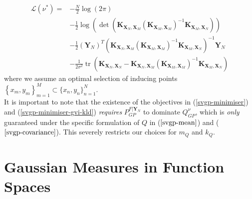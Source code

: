 \documentclass[twoside,11pt]{article}
\newcommand{\tr}{\operatorname{tr}}
\begin{document}
\begin{align}
    \label{svgp-optimal-elbo}
    \mathcal{L}(\nu^*) = &-\frac{N}{2} \log\left(2\pi \right)\\
    &-\frac{1}{2} \log \left(\det\left( \mathbf{K}_{\mathbf{X}_N, \mathbf{X}_M}\left(\mathbf{K}_{\mathbf{X}_M, \mathbf{X}_M}\right)^{-1} \mathbf{K}_{\mathbf{X}_M, \mathbf{X}_N}\right)\right)\\
    & -\frac{1}{2} \left(\mathbf{Y}_N\right)^T \left( \mathbf{K}_{\mathbf{X}_N, \mathbf{X}_M}\left(\mathbf{K}_{\mathbf{X}_M, \mathbf{X}_M}\right)^{-1} \mathbf{K}_{\mathbf{X}_M, \mathbf{X}_N}\right)^{-1} \mathbf{Y}_N \\
    &  - \frac{1}{2\sigma^2}\tr\left(\mathbf{K}_{\mathbf{X}_N, \mathbf{X}_N} - \mathbf{K}_{\mathbf{X}_N, \mathbf{X}_M}\left(\mathbf{K}_{\mathbf{X}_M, \mathbf{X}_M}\right)^{-1} \mathbf{K}_{\mathbf{X}_M, \mathbf{X}_N}\right)
\end{align}
where we assume an optimal selection of inducing points $\left\{x_m, y_m\right\}_{m=1}^{M} \subset \{x_n, y_n\}_{n=1}^{N}$.
\\It is important to note that the existence of the objectives in (\ref{svgp-minimiser}) and (\ref{svgp-minimiser-gvi-kld}) \textit{requires} $P_{GP}^{F \vert \mathbf{Y}_N}$ to dominate $Q_{GP}^{\nu}$, which is \textit{only} guaranteed under the specific formulation of $Q$ in ($\ref{svgp-mean}$) and ($\ref{svgp-covariance}$). This severely restricts our choices for $m_Q$ and $k_Q$. 
\section{Gaussian Measures in Function Spaces}
\end{document}
